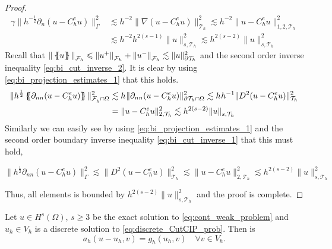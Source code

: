 \begin{proof}
\[        \begin{split}
            \gamma \| h^{-\frac{1}{2}}  \partial _{n} ( u - C_{h}^{e}u ) \|_{ \Gamma    }^{  2} & \lesssim h^{-2} \|   \nabla  ( u - C_{h}^{e}u )    \|_{ \mathcal{T}_{h} }^{2  }  \lesssim  h^{-2} \|    u - C_{h}^{e}u     \|_{1,2, \mathcal{T}_{h}   }^{2  } \\
            & \lesssim h^{-2} h^{2(s-1)}   \| u \|_{s, \mathcal{T}_{h}   }^{  2}  \lesssim  h^{2(s- 2)}   \| u \|_{s, \mathcal{T}_{h}   }^{  2}
        \end{split}
    \]
            Recall that $\| \left\{\!\!\left\{ u \right\}\!\!\right\}   \|_{ \mathcal{F} _{h} }^{  } \leqslant \| u^{+} \|_{ \mathcal{F} _{h}  }^{  } + \| u^{-} \|_{ \mathcal{F} _{h}  }^{  }   \lesssim  \| u \|_{ \partial\mathcal{T }_{h}  }^{2  }  $ and the second order inverse
            inequality \eqref{eq:bi_cut_inverse_2}. It is clear
            by using \eqref{eq:bi_projection_estimates_1} that this holds.
            \[
                \begin{split}
 \| h^{\frac{1}{2}} \left\{\!\!\left\{ \partial _{nn} (u - C_{h}^{e}u) \right\}\!\!\right\}   \|_{\mathcal{F} _{h}^{} \cap \Omega   }^{  2} &  \lesssim h^{} \|   \partial _{nn} (u - C_{h}^{e}u)    \|_{\partial \mathcal{T} _{h} \cap \Omega    }^{  2}  \lesssim h^{} h^{-1}  \|   D^2 (u - C_{h}^{e}u)    \|_{ \mathcal{T} _{h}   }^{  2} \\
                                                                                                                &  = \|   u - C_{h}^{e}u    \|_{ 2, \mathcal{T} _{h}   }^{  2}  \lesssim h^{2(s - 2)}  \| u \|_{s, \mathcal{T} _{h} }^{  }
                \end{split}
            \]
                Similarly we can easily see by using \eqref{eq:bi_projection_estimates_1} and the second order boundary inverse inequality  \eqref{eq:bi_cut_inverse_1} that this must hold,

                \[
              \| h^{\frac{1}{2}} \partial _{nn}(u - C_{h}^{e}u)     \|_{ \Gamma }^{  2} \lesssim   \|  D^2(u - C_{h}^{e}u)     \|_{ \mathcal{T}_{h}   }^{  2} \lesssim \|  u - C_{h}^{e}u \|_{ 2, \mathcal{T}_{h} }^{2  } \lesssim h^{2(s-2)}  \| u \|_{ s, \mathcal{T}_{h}   }^{2  }
            \]

    Thus, all elements is bounded by $ h^{2(s-2)}  \| u \|_{ s, \mathcal{T}_{h}   }^{2  } $  and the proof is complete.
\end{proof}

\begin{lemma}
Let $u \in H^{s}( \Omega )  $, $ s\ge 3 $  be the exact solution to   \eqref{eq:cont_weak_problem} and $u_{h} \in V_{h}$ is a discrete solution to \eqref{eq:discrete_CutCIP_prob}. Then is \[
    a_{h}( u - u_{h}, v) = g_{h} ( u_{h}, v) \quad \forall v \in V_{h}.
    \]
\end{lemma}

